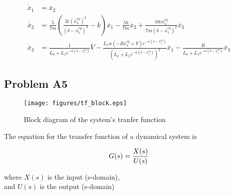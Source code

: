 \documentclass[a4paper,10pt,reqno]{amsart}
\numberwithin{equation}{section}
\begin{document}
\begin{subequations}\label{eq:linear_system}
     \begin{align}
          \dot{\overline{x}}_1 &= \overline{x}_2 \\
          \dot{\overline{x}}_2 &= \frac{5}{7 m}\left(\frac{2 c (x_{3}^{eq})^{2}}{\left(\delta - x_{1}^{eq}\right)^{3}} - k\right)\overline{x}_1  - \frac{5 b}{7 m}\overline{x}_2 + \frac{10 c x_{3}^{eq}}{7 m \left(\delta - x_{1}^{eq}\right)^{2}}\overline{x}_3\\
          \dot{\overline{x}}_3 &= \frac{1}{L_{0} + L_{1} e^{- \alpha \left(\delta - x_{1}^{eq}\right)}}\overline{V} - \frac{L_{1} \alpha \left(- R x_{3}^{eq} + V\right) e^{- \alpha \left(\delta - x_{1}^{eq}\right)}}{\left(L_{0} + L_{1} e^{- \alpha \left(\delta - x_{1}^{eq}\right)}\right)^{2}}\overline{x}_1 - \frac{R}{L_{0} + L_{1} e^{- \alpha \left(\delta - x_{1}^{eq}\right)}}\overline{x}_3
     \end{align}
\end{subequations}

\subsection{Problem A5}\label{sec:a5}\hfill

\setlength{\jot}{5pt} %

\begin{figure}[H]
     \texttt{[image: figures/tf\_block.eps]}
     \caption{Block diagram of the system's tranfer function}
     \label{fig:tfBlock}
\end{figure}

The equation for the transfer function of a dynamical system is

\begin{equation}
     G(s) = \frac{X(s)}{U(s)} \label{eq:TF} \\
\end{equation}

\begin{center}
     where $X(s)$ is the input (s-domain), \\
     and $U(s)$ is the output (s-domain)
\end{center}
\vspace{10pt}
\end{document}
